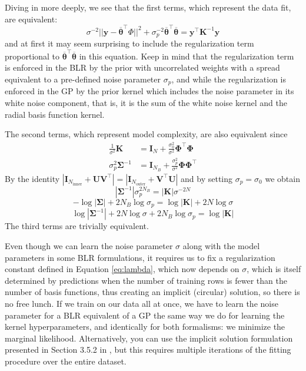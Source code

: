 \documentclass{article}
\begin{document}
Diving in more deeply, we see that the first terms, which represent the data fit, are equivalent:
\begin{equation}
    \sigma^{-2}||\mathbf{y}-\overline{\boldsymbol{\theta}} ^\top \Phi ||^2 +\sigma_p^{-2} \overline{\boldsymbol{\theta}}^\top\overline{\boldsymbol{\theta}} = \mathbf{y}^\top \mathbf{K}^{-1} \mathbf{y} 
\end{equation}and at first it may seem surprising to include the regularization term proportional to $\overline{\boldsymbol{\theta}}^\top\overline{\boldsymbol{\theta}}$ in this equation. Keep in mind that the regularization term is enforced in the BLR by the prior with uncorrelated weights with a spread equivalent to a pre-defined noise parameter $\sigma_p$, and while the regularization is enforced in the GP by the prior kernel which includes the noise parameter in its white noise component, that is, it is the sum of the white noise kernel and the radial basis function kernel. 

The second terms, which represent model complexity, are also equivalent since \begin{equation}
\begin{split}
\frac{1}{\sigma^2}\mathbf{K}&= \mathbf{I}_N+\frac{\sigma^2_0}{\sigma^2}\boldsymbol{\Phi}^\top\boldsymbol{\Phi} \\
\sigma_p^2\boldsymbol{\Sigma}^{-1} &=\mathbf{I}_{N_B}+ \frac{\sigma_p^2}{\sigma^2}\boldsymbol{\Phi}\boldsymbol{\Phi}^\top
\end{split}\end{equation}By the identity $|\mathbf{I}_{N_\text{inner}}+\mathbf{UV}^\top|=|\mathbf{I}_{N_\text{outer}}+\mathbf{V}^\top\mathbf{U}|$ and by setting $\sigma_p=\sigma_0$ we obtain
\begin{equation}
|\boldsymbol{\Sigma}^{-1}|\sigma_p^{2N_B}=|\mathbf{K}|\sigma^{-2N}\end{equation}\begin{equation}
-\log|\boldsymbol{\Sigma}|+2N_B\log\sigma_p=\log|\mathbf{K}|+ 2N\log\sigma\end{equation}\begin{equation}
\log|\boldsymbol{\Sigma}^{-1}|+2N\log\sigma+2N_B \log \sigma_p=\log|\mathbf{K}|\end{equation}The third terms are trivially equivalent.

Even though we can learn the noise parameter $\sigma$ along with the model parameters in some BLR formulations\cite{KoyoteScience}, it requires us to fix a regularization constant defined in Equation \ref{eq:lambda}, which now depends on $\sigma$, which is itself determined by predictions when the number of training rows is fewer than the number of basis functions, thus creating an implicit (circular) solution, so there is no free lunch. If we train on our data all at once, we have to learn the noise parameter for a BLR equivalent of a GP the same way we do for learning the kernel hyperparameters, and identically for both formalisms: we minimize the marginal likelihood. Alternatively, you can use the implicit solution formulation presented in Section 3.5.2 in \cite{bishop}, but this requires multiple iterations of the fitting procedure over the entire dataset.
\end{document}
